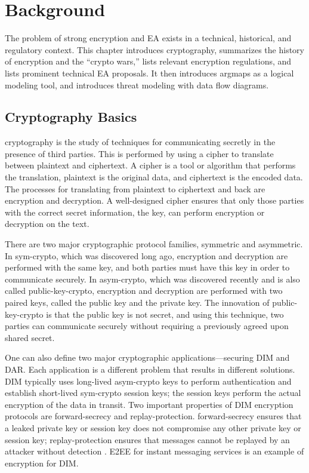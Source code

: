 \chapter{Background}
\label{chap-background}

The problem of strong encryption and \acl{EA} exists in a technical, historical, and regulatory context. This chapter
introduces cryptography, summarizes the history of encryption and the ``crypto wars,'' lists relevant encryption
regulations, and lists prominent technical \ac{EA} proposals. It then introduces \acp{argmap} as a logical modeling
tool, and introduces threat modeling with data flow diagrams.



\section{Cryptography Basics}
\label{sec-crypto-basics}

\Ac{cryptography} is the study of techniques for communicating secretly in the presence of third parties. This is
performed by using a \ac{cipher} to translate between \ac{plaintext} and \ac{ciphertext}. A cipher is a tool or
algorithm that performs the translation, plaintext is the original data, and ciphertext is the encoded data. The
processes for translating from plaintext to ciphertext and back are \ac{encryption} and \ac{decryption}. A well-designed
cipher ensures that only those parties with the correct secret information, the \ac{key}, can perform encryption or
decryption on the text.


There are two major cryptographic protocol families, symmetric and asymmetric. In \ac{sym-crypto}, which was discovered
long ago, encryption and decryption are performed with the same key, and both parties must have this key in order to
communicate securely. In \ac{asym-crypto}, which was discovered recently and is also called \ac{public-key-crypto},
encryption and decryption are performed with two paired keys, called the public key and the private key. The innovation
of \ac{public-key-crypto} is that the public key is not secret, and using this technique, two parties can communicate
securely without requiring a previously agreed upon shared secret.

One can also define two major cryptographic applications---securing \acf{DIM} and \acf{DAR}. Each application is a
different problem that results in different solutions. \Ac{DIM} typically uses long-lived \ac{asym-crypto} keys to
perform authentication and establish short-lived \ac{sym-crypto} session keys; the session keys perform the actual
encryption of the data in transit. Two important properties of \ac{DIM} encryption protocols are \ac{forward-secrecy}
and \ac{replay-protection}. \Ac{forward-secrecy} ensures that a leaked private key or session key does not compromise
any other private key or session key; \ac{replay-protection} ensures that messages cannot be replayed by an
attacker without detection \cite{bellovin_thinking_2016}. \Ac{E2EE} for instant messaging services is an example of
encryption for \ac{DIM}.

